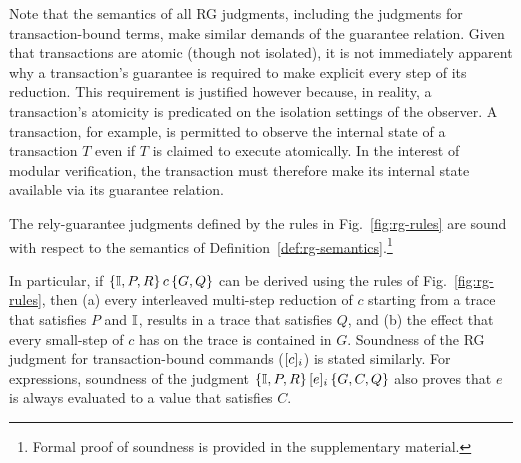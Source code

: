 Note that the semantics of all RG judgments, including the judgments
for transaction-bound terms, make similar demands of the guarantee
relation. Given that transactions are atomic (though not isolated), it
is not immediately apparent why a transaction's guarantee is required
to make explicit every step of its reduction. This requirement is
justified however because, in reality, a transaction's atomicity is
predicated on the isolation settings of the observer. A  transaction, for example, is permitted to observe the
internal state of a transaction $T$ even if $T$ is claimed to execute
atomically.  In the interest of modular verification, the transaction
must therefore make its internal state available via its guarantee
relation.

\begin{theorem} 
The rely-guarantee judgments defined by the rules in
Fig.~\ref{fig:rg-rules} are sound with respect to the semantics of
Definition~\ref{def:rg-semantics}.\footnote{Formal proof of soundness
is provided in the supplementary material.}
\end{theorem}

\noindent In particular, if $\{\mathbb{I},P,R\}\,c\,\{G,Q\}$ can be derived using
the rules of Fig.~\ref{fig:rg-rules}, then (a) every interleaved
multi-step reduction of $c$ starting from a trace that satisfies $P$
and $\mathbb{I}$, results in a trace that satisfies $Q$, and (b) the effect
that every small-step of $c$ has on the trace is contained in $G$.
Soundness of the RG judgment for transaction-bound commands
($\lbrack c \rbrack_i$) is stated similarly.  For expressions, soundness of
the judgment $\{\mathbb{I},P,R\}\,\lbrack e \rbrack_i\,\{G,C,Q\}$ also proves that $e$
is always evaluated to a value that satisfies $C$.

